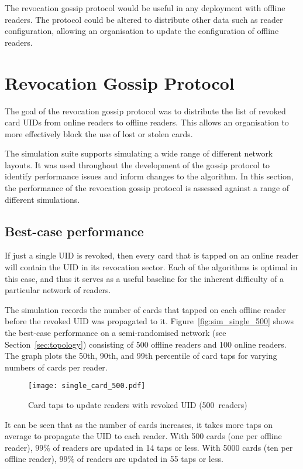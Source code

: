 \documentclass[dissertation.tex]{subfiles}
\begin{document}
  The revocation gossip protocol would be useful in any deployment with offline readers. The protocol could be altered to distribute other data such as reader configuration, allowing an organisation to update the configuration of offline readers.

  \section{Revocation Gossip Protocol}
  The goal of the revocation gossip protocol was to distribute the list of revoked card UIDs from online readers to offline readers. This allows an organisation to more effectively block the use of lost or stolen cards.

  The simulation suite supports simulating a wide range of different network layouts. It was used throughout the development of the gossip protocol to identify performance issues and inform changes to the algorithm. In this section, the performance of the revocation gossip protocol is assessed against a range of different simulations.

  \subsection{Best-case performance}

  If just a single UID is revoked, then every card that is tapped on an online reader will contain the UID in its revocation sector. Each of the algorithms is optimal in this case, and thus it serves as a useful baseline for the inherent difficulty of a particular network of readers.

  The simulation records the number of cards that tapped on each offline reader before the revoked UID was propagated to it. Figure~\vref{fig:sim_single_500} shows the best-case performance on a semi-randomised network (see Section~\ref{sec:topology}) consisting of 500 offline readers and 100 online readers. The graph plots the 50th, 90th, and 99th percentile of card taps for varying numbers of cards per reader.

  \begin{figure}[h]
    \texttt{[image: single\_card\_500.pdf]}
    \caption{Card taps to update readers with revoked UID (\SI{500}{readers})}\label{fig:sim_single_500}
  \end{figure}

  It can be seen that as the number of cards increases, it takes more taps on average to propagate the UID to each reader. With 500 cards (one per offline reader), $99\%$ of readers are updated in 14 taps or less. With 5000 cards (ten per offline reader), $99\%$ of readers are updated in 55 taps or less.
\end{document}
